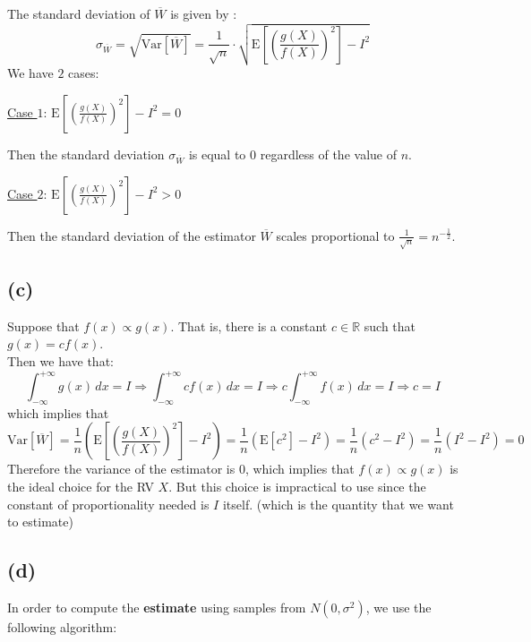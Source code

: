 \documentclass[11pt]{article}
\newcommand{\subsectionindent}{\hspace{30pt}}
\newcommand{\expectation}{\mathrm{E}}
\newcommand{\variance}{\mathrm{Var}}
\begin{document}
The standard deviation of $\overline{W}$ is given by :
\[ \sigma_{\overline{W}} 
= \sqrt{\variance \left[ \overline{W} \right]} 
= \frac{1}{\sqrt{n}} \cdot \sqrt{ \expectation \left[ \left( \frac{ g(X) }{ f(X) } \right) ^ 2 \right] - I ^ 2 }
\]
We have $2$ cases:

\medskip 

\quad \underline{Case $1$}: $\expectation \left[ \left( \frac{ g(X) }{ f(X) } \right) ^ 2 \right] - I ^ 2 = 0$

Then the standard deviation $\sigma_{\overline{W}}$ is equal to $0$ regardless of the value of $n$. 

\medskip

\quad \underline{Case $2$}: $\expectation \left[ \left( \frac{ g(X) }{ f(X) } \right) ^ 2 \right] - I ^ 2 > 0$

Then the standard deviation of the estimator $\overline{W}$ scales proportional to $\frac{1}{\sqrt{n}} = n ^ { - \frac{1}{2} }$.


\subsection*{\subsectionindent (c)}

Suppose that $f(x) \propto g(x)$. That is, there is a constant $c \in \mathbb{R}$ such that $g(x) = c f(x)$.
\\ Then we have that: 
\[
\int_{- \infty}^{+ \infty} g(x) \, dx = I \Rightarrow \int_{- \infty}^{+ \infty} c f(x) \, dx = I \Rightarrow c \int_{- \infty}^{+ \infty} f(x) \, dx = I \Rightarrow c = I
\tag{since $X$ has pdf $f(x)$ } 
\]
which implies that
\[
\variance \left[ \overline{W} \right] 
= \frac{1}{n} \left( \expectation \left[ \left( \frac{ g(X) }{ f(X) } \right) ^ 2 \right] - I ^ 2 \right) 
= \frac{1}{n} \left( \expectation \left[ c ^ 2 \right] - I ^ 2 \right)
= \frac{1}{n} \left( c ^ 2 - I ^ 2 \right)
= \frac{1}{n} \left( I ^ 2 - I ^ 2 \right)
= 0
\]
Therefore the variance of the estimator is $0$, which implies that $f(x) \propto g(x)$ is the ideal choice for the RV $X$. But this choice is impractical to use since the constant of proportionality needed is $I$ itself. (which is the quantity that we want to estimate)


\subsection*{\subsectionindent (d)}

In order to compute the \textbf{estimate} using samples from $N(0,\sigma ^ 2)$, we use the following algorithm: 
\end{document}
